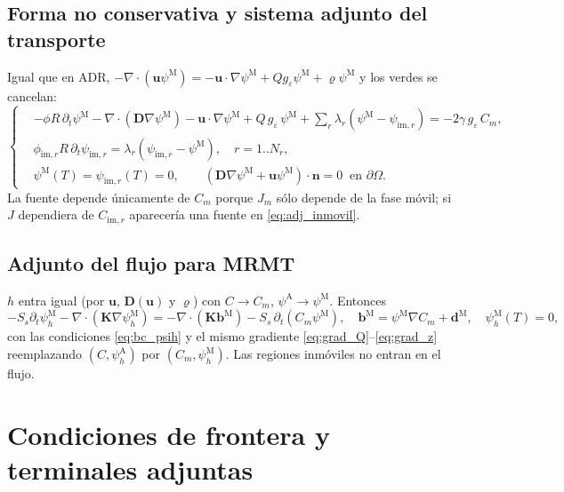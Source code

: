 \documentclass[11pt]{article}
\numberwithin{equation}{section}
\theoremstyle{remark}
\newcommand{\bu}{\mathbf{u}}
\newcommand{\bK}{\mathbf{K}}
\newcommand{\bD}{\mathbf{D}}
\newcommand{\bn}{\mathbf{n}}
\newcommand{\bb}{\mathbf{b}}
\newcommand{\bd}{\mathbf{d}}
\newcommand{\geps}{g_\varepsilon}
\newcommand{\im}{\mathrm{im}}
\newcommand{\vr}{\varrho}              %
\newcommand{\pA}{\psi^{\mathrm{A}}}    %
\newcommand{\pM}{\psi^{\mathrm{M}}}    %
\newcommand{\pim}{\psi_{\im,r}}          %
\newcommand{\ph}[1]{\psi_h^{\mathrm{#1}}}  %
\begin{document}
\subsection{Forma no conservativa y sistema adjunto del transporte}
Igual que en ADR, $-\nabla\!\cdot(\bu\pM)=-\bu\cdot\nabla\pM+Q\geps\pM+\vr\pM$ y los verdes se cancelan:
\begin{equation}
\left\{\begin{aligned}
&-\phi R\,\partial_t\pM-\nabla\!\cdot(\bD\nabla\pM)-\bu\cdot\nabla\pM+Q\,\geps\,\pM+\sum_r\lambda_r(\pM-\pim)=-2\gamma\,\geps\,C_m,\\
&\phi_{\im,r}R\,\partial_t\pim=\lambda_r(\pim-\pM),\quad r=1..N_r,\\
&\pM(T)=\pim(T)=0,\qquad(\bD\nabla\pM+\bu\pM)\cdot\bn=0\ \text{ en }\partial\Omega .
\end{aligned}\right.
\label{eq:sistema_adjunto_M}
\end{equation}
La fuente depende \'unicamente de $C_m$ porque $J_m$ s\'olo depende de la fase m\'ovil; si $J$ dependiera de $C_{\im,r}$ aparecer\'ia una fuente en \eqref{eq:adj_inmovil}.

\subsection{Adjunto del flujo para MRMT}
$h$ entra igual (por $\bu$, $\bD(\bu)$ y $\vr$) con $C\to C_m$, $\pA\to\pM$. Entonces
\begin{equation}
-S_s\partial_t\ph{M}-\nabla\!\cdot(\bK\nabla\ph{M})=-\nabla\!\cdot(\bK\bb^{\mathrm M})-S_s\,\partial_t(C_m\pM),\quad\bb^{\mathrm M}=\pM\nabla C_m+\bd^{\mathrm M},\quad\ph{M}(T)=0,
\label{eq:adj_flujo_M}
\end{equation}
con las condiciones \eqref{eq:bc_psih} y el mismo gradiente \eqref{eq:grad_Q}--\eqref{eq:grad_z} reemplazando $(C,\ph{A})$ por $(C_m,\ph{M})$. Las regiones inm\'oviles no entran en el flujo.

\section{Condiciones de frontera y terminales adjuntas}
\label{sec:bc_adj}
\end{document}
